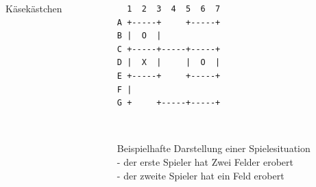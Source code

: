 
\usepackage{hyperref}
\usepackage{csquotes}
\usepackage{tikz}
\usetikzlibrary{fit,backgrounds}

\usepackage[font=normalsize, labelfont=sf, position=bottom]{caption}
\usepackage[labelfont=normalfont, position=bottom]{subcaption}
\captionsetup[figure]{justification=centering}
\setlength{\parindent}{0pt}

\def\gamefont{\bfseries\sffamily}




\subtitle{Programmierchallenge}

\begin{frame}[fragile]
    \titlepage
    \begin{columns}[c]
        \begin{column}{4cm}
            \begin{center}
                {\huge Käsekästchen}
            \end{center}
        \end{column}
        \begin{column}{4cm}
            \begin{figure}
                \begin{BVerbatim}
  1  2  3  4  5  6  7
A +-----+     +-----+
B |  O  |
C +-----+-----+-----+
D |  X  |     |  O  |
E +-----+     +-----+
F |
G +     +-----+-----+
                \end{BVerbatim}
                \\	\sffamily\raggedright\tiny Beispielhafte Darstellung einer Spielesituation\\- der erste Spieler hat Zwei Felder erobert \\- der zweite Spieler hat ein Feld erobert
            \end{figure}
        \end{column}
    \end{columns}
\end{frame}
